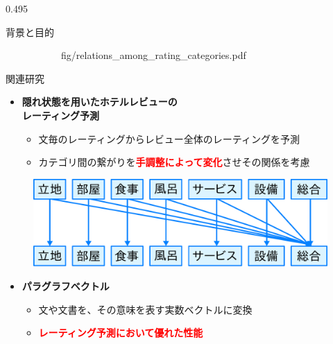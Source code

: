 \documentclass[unicode,10pt]{beamer}
\newcommand{\columnsize}{0.495\textwidth}
\newcommand{\itemtitle}[1]{\textbf{#1}\\}
\newcommand{\fire}[1]{\textcolor{red}{\textbf{#1}}}
\begin{document}
\begin{frame}
\begin{columns}[onlytextwidth,t]
\begin{column}{\columnsize}
\begin{block}{背景と目的}
\begin{figure}
\begin{subfigure}[t]{0.45\linewidth}
                        {fig/relations_among_rating_categories.pdf}
      \end{subfigure}
      \hspace*{\fill} %
    \end{figure}
  \end{block}

  \begin{block}{関連研究}
    \begin{itemize}
      \item \itemtitle{隠れ状態を用いたホテルレビューの\\
                       レーティング予測\cite{fujitani15}}
        \begin{itemize}
          \item 文毎のレーティングからレビュー全体のレーティングを予測
          \item カテゴリ間の繋がりを\fire{手調整によって変化}させその関係を考慮
        \end{itemize}
    \end{itemize}
    \begin{figure}
      \includegraphics[width=0.7\linewidth]
          {fig/fujitani_miml_relations_among_rating_categories.pdf}
    \end{figure}
    \begin{itemize}
      \item \itemtitle{パラグラフベクトル\cite{quoc14}}
        \begin{itemize}
          \item 文や文書を、その意味を表す実数ベクトルに変換
          \item \fire{レーティング予測において優れた性能}
        \end{itemize}

\end{itemize}
\end{block}
\end{column}
\end{columns}
\end{frame}
\end{document}
